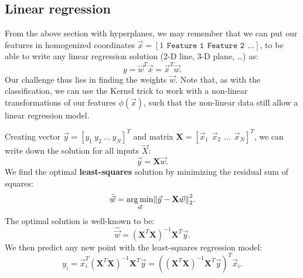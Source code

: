 \documentclass{article}
\DeclarePairedDelimiter\norm{\lVert}{\rVert}%
\DeclareMathOperator*{\argmin}{arg\,min}
\begin{document}
\subsection{Linear regression}
From the above section with hyperplanes, we may remember that we can put our features in homogenized coordinates $\vec{x}=[1\ \,\texttt{Feature 1}\ \,\texttt{Feature 2}\ \,\dots]$, to be able to write any linear regression solution (2-D line, 3-D plane, \dots) as:
\begin{equation}
    y = \vec{w}^T\vec{x}=\vec{x}^T\vec{w}.
\end{equation}
Our challenge thus lies in finding the weights $\vec{w}$. Note that, as with the classification, we can use the Kernel trick to work with a non-linear transformations of our features $\phi(\vec{x})$, such that the non-linear data still allow a linear regression model.
\begin{spexample}
    Creating vector $\vec{y}=[y_1\ y_2\ \dots\ y_N]^T$ and matrix $\mathbf{X}=[\vec{x}_1\ \, \vec{x}_2\ \,\dots\  \,\vec{x}_N]^T$, we can write down the solution for all inputs $\vec{X}$:
    \begin{equation}
        \vec{y} = \mathbf{X}\vec{w}.
    \end{equation}
    We find the optimal \textbf{least-squares} solution by minimizing the residual sum of squares:
    \begin{equation}
        \hat{\vec{w}} = \argmin_{\vec{w}} \norm*{\vec{y}-\mathbf{X}\vec{w}}^2_2.
    \end{equation}
    The optimal solution is well-known to be:
    \begin{equation}
        \hat{\vec{w}} = (\mathbf{X}^{T}\mathbf{X})^{-1} \mathbf{X}^{T}\vec{y}.
    \end{equation}
    We then predict any new point with the least-squares regression model:
    \begin{equation}
        y_i = \vec{x}_i^T (\mathbf{X}^{T}\mathbf{X})^{-1} \mathbf{X}^{T}\vec{y} =  \left((\mathbf{X}^{T}\mathbf{X})^{-1} \mathbf{X}^{T}\vec{y}\right)^T\vec{x}_i.
    \end{equation}
\end{spexample}
\end{document}
